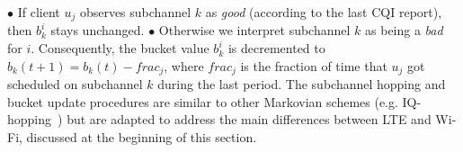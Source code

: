 \vskip 2pt
\noindent $\bullet$ If client $u_j$ observes subchannel $k$ as \emph{good} (according to the last CQI report), then $b^{i}_{k}$ stays unchanged.
\vskip 2pt
\noindent $\bullet$ Otherwise we interpret subchannel $k$ as being a \emph{bad} for \eNB $i$. Consequently, the bucket value $b^{i}_{k}$ is decremented to $b_k(t+1) = b_k(t) - frac_j$, where $frac_j$ is the fraction of time that $u_j$ got scheduled on subchannel $k$ during the last period.
\vskip 2pt
The subchannel hopping and bucket update procedures are similar to other Markovian schemes (e.g. IQ-hopping~\cite{iqhop}) but are adapted to address the main differences between LTE and Wi-Fi, discussed at the beginning of this section.







